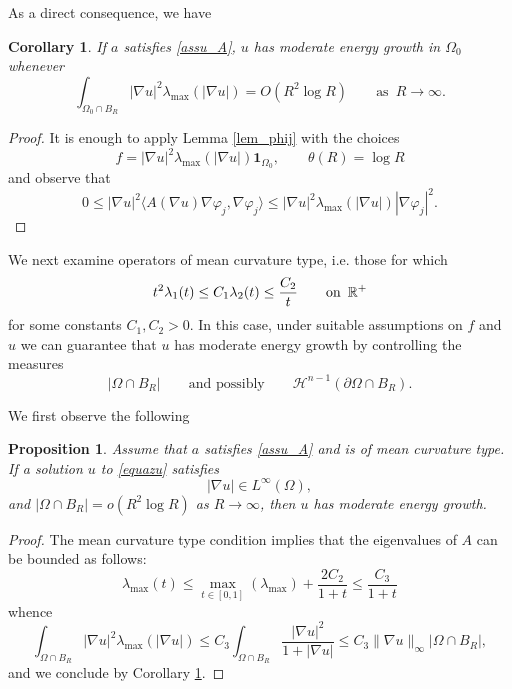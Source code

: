 \documentclass[10 pt,a4paper]{article}
\newtheorem{proposition}[definition]{Proposition}
\newtheorem{corollary}[definition]{Corollary}
\theoremstyle{definition}
\begin{document}
As a direct consequence, we have

\begin{corollary}\label{cor_lowenergy}
	If $a$ satisfies \eqref{assu_A}, $u$ has moderate energy growth in $\Omega_0$ whenever
	\[
	\int_{\Omega_0 \cap B_R} |\nabla u|^2\lambda_{\max}(|\nabla u|) = O(R^2 \log R) \qquad \text{as } \, R \to \infty. 
	\]
\end{corollary}

\begin{proof}
	It is enough to apply Lemma \ref{lem_phij} with the choices 
	\[
	f = |\nabla u|^2\lambda_{\max}(|\nabla u|) \mathbf{1}_{\Omega_0}, \qquad \theta(R) = \log R 
	\]
	and observe that 
	\[
	0 \le |\nabla u|^2 \langle A(\nabla u)\nabla \varphi_j, \nabla \varphi_j \rangle \le |\nabla u|^2 \lambda_{\max}(|\nabla u|)|\nabla \varphi_j|^2.   
	\]
\end{proof}

We next examine operators of mean curvature type, i.e. those for which 
\begin{equation}\label{eq_meancurv_type}
t^2 \lambda_1(t) \le C_1 \lambda_2(t) \le \frac{C_2}{t} \qquad \text{on } \, \mathbb R^+
\end{equation}
for some constants $C_1,C_2>0$. In this case, under suitable assumptions on $f$ and $u$ we can guarantee that $u$ has moderate energy growth by controlling the measures 
\[
|\Omega \cap B_R| \qquad \text{and possibly} \qquad \mathscr{H}^{n-1}(\partial \Omega \cap B_R).
\]

We first observe the following

\begin{proposition}\label{prop_moderate_boundgradient}
	Assume that $a$ satisfies \eqref{assu_A} and is of mean curvature type. If a solution $u$ to \eqref{equazu} satisfies
	\[
	|\nabla u| \in L^\infty(\Omega),
	\]
	and $|\Omega \cap B_R| = o(R^2 \log R)$ as $R \to \infty$, then $u$ has moderate energy growth.
\end{proposition}

\begin{proof}
	The mean curvature type condition implies that the eigenvalues of $A$ can be bounded as follows: 
	\[
	\lambda_{\max}(t) \le \max_{t \in [0,1]}(\lambda_{\max}) + \frac{2C_2}{1+t} \le \frac{C_3}{1+t}
	\]
	whence
	\begin{equation}\label{eq_uppermean}
	\int_{\Omega \cap B_R} |\nabla u|^2 \lambda_{\max} (|\nabla u|) \le C_3 \int_{\Omega \cap B_R} \frac{|\nabla u|^2}{1+|\nabla u|} \le C_3 \|\nabla u\|_\infty |\Omega \cap B_R|,  
	\end{equation}
	and we conclude by Corollary \ref{cor_lowenergy}.
\end{proof}
\end{document}
